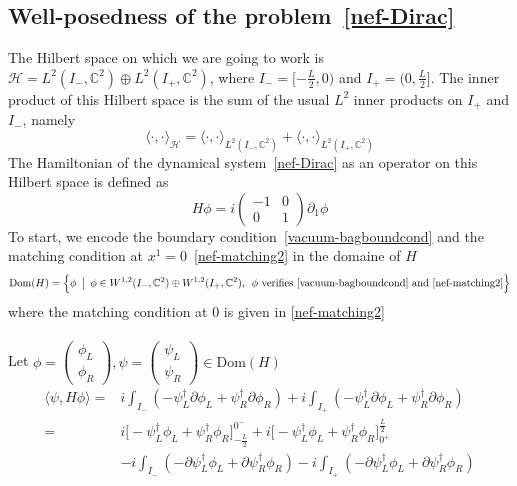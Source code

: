 \subsection{Well-posedness of the problem~\cref{nef-Dirac}}\label{vacuum-subsect-sa}
The Hilbert space on which we are going to work is $\mathcal{H} = L^{2}(I_-, \mathbb{C}^2) \oplus L^{2}(I_+, \mathbb{C}^2)$,  where $I_- = [-\frac{L}{2}, 0)$ and $I_+ = (0, \frac{L}{2}]$.
The inner product of this Hilbert space is the sum of the usual $L^2$ inner products on $I_+$ and $I_-$, namely
\begin{equation*}
\langle \cdot, \cdot\rangle_{\mathcal{H} } = \langle \cdot, \cdot\rangle_{L^{2}(I_-, \mathbb{C}^2)} +\langle \cdot, \cdot\rangle_{L^{2}(I_+, \mathbb{C}^2)}
\end{equation*}
The Hamiltonian of the dynamical system~\cref{nef-Dirac} as an operator on this Hilbert space is defined as
\begin{equation}
H \phi = i \begin{pmatrix}
-1  &  0 \\
0  &  1  \end{pmatrix} \partial_1 \phi 
\end{equation}
To start, we encode the boundary condition~\cref{vacuum-bagboundcond} and the matching condition at $x^1 = 0$~\cref{nef-matching2} in the domaine of $H$ 
\begin{equation*}
\mathrm{Dom}(H) = \Big \{\phi \enskip \big\vert \enskip \phi \in W^{1,2}(I_-, \mathbb{C}^2) \oplus W^{1,2}(I_+, \mathbb{C}^2), \enskip \phi \textrm{ verifies~\cref{vacuum-bagboundcond} and~\cref{nef-matching2}} \Big \}
\end{equation*} 
where the matching condition at 0 is given in \cref{nef-matching2}\\\\
Let $ \phi = \begin{pmatrix} \phi_L \\ \phi_R \end{pmatrix}, \psi = \begin{pmatrix} \psi_L \\ \psi_R \end{pmatrix} \in \mathrm{Dom}(H)$
\begin{equation}\label{sa-hamiltonian}
\begin{split}
\langle \psi, H \phi \rangle = & i \int_{I_-} ( - \psi_L^\dagger \partial \phi_L + \psi_R^\dagger \partial \phi_R )
+ i \int_{I_+} ( - \psi_L^\dagger \partial \phi_L + \psi_R^\dagger \partial \phi_R ) \\
= & i \big[-\psi_L^\dagger \phi_L + \psi_R^\dagger \phi_R \big]^{0^-}_{-\frac{L}{2}} + i \big[-\psi_L^\dagger \phi_L + \psi_R^\dagger \phi_R \big]_{0^+}^{\frac{L}{2}} \\
& - i \int_{I_-} ( - \partial \psi_L^\dagger \phi_L + \partial \psi_R^\dagger  \phi_R ) - i \int_{I_+} ( - \partial \psi_L^\dagger \phi_L + \partial \psi_R^\dagger  \phi_R ) 
\end{split}
\end{equation}

